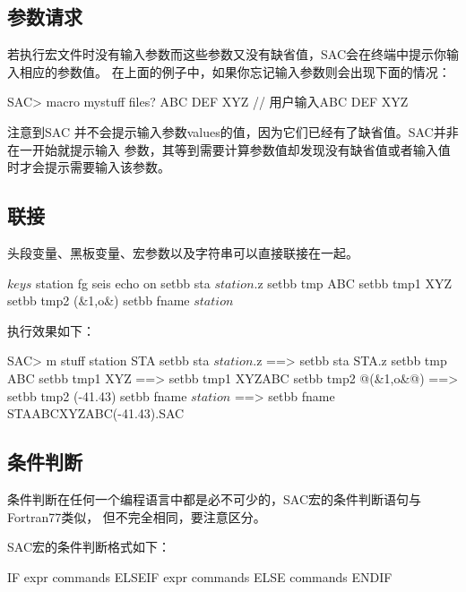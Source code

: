 \subsection{参数请求}
若执行宏文件时没有输入参数而这些参数又没有缺省值，SAC会在终端中提示你输入相应的参数值。
在上面的例子中，如果你忘记输入参数则会出现下面的情况：
\begin{SACCode}
SAC> macro mystuff
files? ABC DEF XYZ          // 用户输入ABC DEF XYZ
\end{SACCode}
注意到SAC 并不会提示输入参数values的值，因为它们已经有了缺省值。SAC并非在一开始就提示输入
参数，其等到需要计算参数值却发现没有缺省值或者输入值时才会提示需要输入该参数。

\subsection{联接}
头段变量、黑板变量、宏参数以及字符串可以直接联接在一起。

\begin{SACCode}
$keys$ station                                                                   
fg seis                                                                          
echo on                                                                          
setbb sta $station$.z                                                            
setbb tmp ABC                                                                    
setbb tmp1 XYZ%
setbb tmp2 (&1,o&)                                                               
setbb fname $station$%
\end{SACCode}

执行效果如下：
\begin{SACCode}
SAC> m stuff station STA
 setbb sta $station$.z
 ==>  setbb sta STA.z
 setbb tmp ABC
 setbb tmp1 XYZ%
 ==>  setbb tmp1 XYZABC
 setbb tmp2 @(&1,o&@)
 ==>  setbb tmp2 (-41.43)
 setbb fname $station$%
 ==>  setbb fname STAABCXYZABC(-41.43).SAC
\end{SACCode}

\subsection{条件判断}
条件判断在任何一个编程语言中都是必不可少的，SAC宏的条件判断语句与Fortran77类似，
但不完全相同，要注意区分。

SAC宏的条件判断格式如下：
\begin{SACCode}
  IF expr
  	commands
  ELSEIF expr
  	commands
  ELSE
  	commands
  ENDIF
\end{SACCode}

